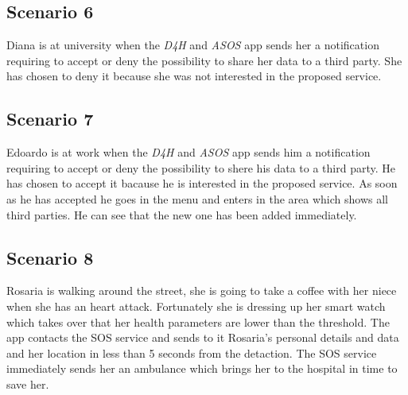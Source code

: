 \subsection{Scenario 6}
Diana is at university when the \textit{D4H} and \textit{ASOS} app sends her a notification requiring to accept or deny the possibility to share her data to a third party.
She has chosen to deny it because she was not interested in the proposed service.

\subsection{Scenario 7}
Edoardo is at work when the \textit{D4H} and \textit{ASOS} app sends him a notification requiring to accept or deny the possibility to shere his data to a third party.
He has chosen to accept it bacause he is interested in the proposed service. As soon as he has accepted he goes in the menu and enters in the area which shows all third parties. He can see that the new one has been added immediately.

\subsection{Scenario 8}
Rosaria is walking around the street, she is going to take a coffee with her niece when she has an heart attack. Fortunately she is dressing up her smart watch which takes over that her health parameters are lower than the threshold. The app contacts the SOS service and sends to it Rosaria's personal details and data and her location in less than 5 seconds from the detaction. The SOS service immediately sends her an ambulance which brings her to the hospital in time to save her.
